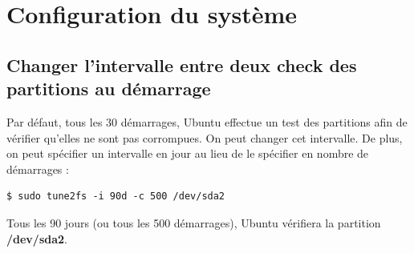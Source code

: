 \documentclass[a4paper,twoside]{article}
\begin{document}
\section{Configuration du système}
\subsection{Changer l'intervalle entre deux check des partitions au démarrage}
Par défaut, tous les 30 démarrages, Ubuntu effectue un test des partitions afin de vérifier qu'elles ne sont pas corrompues. On peut changer cet intervalle. De plus, on peut spécifier un intervalle en jour au lieu de le spécifier en nombre de démarrages :
\begin{verbatim}
$ sudo tune2fs -i 90d -c 500 /dev/sda2
\end{verbatim}
Tous les 90 jours (ou tous les 500 démarrages), Ubuntu vérifiera la partition \textbf{/dev/sda2}.
\end{document}
